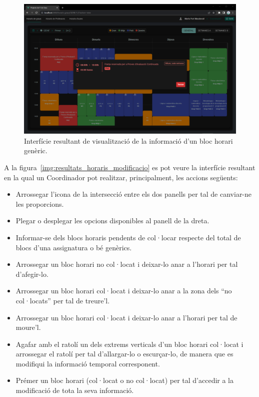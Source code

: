 \documentclass[a4paper,12pt]{ThesisStyle}
\begin{document}
\begin{figure}[H]
  \centering
  \includegraphics[width=\textwidth]{assets/results/horaris/visualitzacioBlocGeneric.png}
  \caption{\label{img:resultats_horaris_visualitzacioBlocGeneric}Interfície resultant de visualització de la informació d'un bloc horari genèric.}
\end{figure}

\newpage

A la figura~\ref{img:resultats_horaris_modificacio} es pot veure la interfície resultant en la qual un Coordinador pot realitzar, principalment, les accions següents:
\begin{itemize}
  \item Arrossegar l'icona de la intersecció entre els dos panells per tal de canviar-ne les proporcions.
  \item Plegar o desplegar les opcions disponibles al panell de la dreta.
  \item Informar-se dels blocs horaris pendents de col·locar respecte del total de blocs d'una assignatura o bé genèrics.
  \item Arrossegar un bloc horari no col·locat i deixar-lo anar a l'horari per tal d'afegir-lo.
  \item Arrossegar un bloc horari col·locat i deixar-lo anar a la zona dels ``no col·locats'' per tal de treure'l.
  \item Arrossegar un bloc horari col·locat i deixar-lo anar a l'horari per tal de moure'l.
  \item Agafar amb el ratolí un dels extrems verticals d'un bloc horari col·locat i arrossegar el ratolí per tal d'allargar-lo o escurçar-lo, de manera que es modifiqui la informació temporal corresponent.
  \item Prémer un bloc horari (col·locat o no col·locat) per tal d'accedir a la modificació de tota la seva informació.
\end{itemize}
\end{document}
